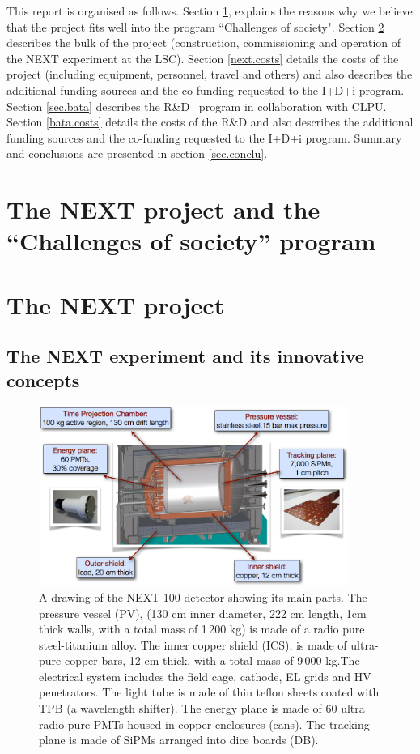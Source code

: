 \documentclass[a4paper,11pt,oneside]{article}
\begin{document}
This report is organised as follows. Section \ref{sec.retos}, explains the reasons why we believe that the project fits well into the program ``Challenges of society". Section \ref{sec.next} describes the bulk of the project (construction, commissioning and operation of the NEXT experiment at the LSC). Section \ref{next.costs} details the costs of the project (including equipment, personnel, travel and others) and also describes the additional funding sources and the co-funding requested to the I+D+i program.  Section \ref{sec.bata} describes the R\&D \BATA\ program in collaboration with CLPU. Section \ref{bata.costs} details the costs of the R\&D and also describes the additional funding sources and the co-funding requested to the I+D+i program.  Summary and conclusions are presented
in section \ref{sec.conclu}.

\section{\bf The NEXT project and the ``Challenges of society'' program }
\label{sec.retos}


\section{\bf The NEXT project}
\label{sec.next}

\subsection*{The NEXT experiment and its innovative concepts}

\begin{figure}
\centering
\includegraphics[width=0.9\textwidth]{img/NEXT.png}
\caption{\small A drawing of the NEXT-100 detector showing its main parts.  The pressure vessel (PV),  (130 cm inner diameter, 222 cm length, 1cm thick walls, with a total mass of 1\,200 kg) is made of a radio pure steel-titanium alloy.
The inner copper shield (ICS), is made of ultra-pure copper bars, 12 cm thick, with a total mass of 9\,000 kg.The electrical system includes the field cage, cathode, EL grids and HV penetrators.
The light tube is made of thin teflon sheets coated with TPB (a wavelength shifter). 
The energy plane is made of 60 ultra radio pure PMTs housed in copper enclosures (cans).
The tracking plane is made of SiPMs arranged into dice boards (DB). 
}\label{fig.NEXT100}
\end{figure}
\end{document}
